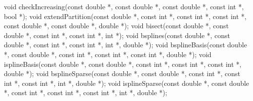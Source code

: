 \documentclass[
  12pt,
  letterpaper,
  DIV=11,
  numbers=noendperiod]{scrreprt}
\newenvironment{Shaded}{\begin{snugshade}}{\end{snugshade}}
\newcommand{\DataTypeTok}[1]{\textcolor[rgb]{0.68,0.00,0.00}{#1}}
\newcommand{\NormalTok}[1]{\textcolor[rgb]{0.00,0.23,0.31}{#1}}
\newcommand{\OperatorTok}[1]{\textcolor[rgb]{0.37,0.37,0.37}{#1}}
\theoremstyle{remark}
\begin{document}
\begin{Shaded}
\begin{Highlighting}[]
\DataTypeTok{void}\NormalTok{ checkIncreasing}\OperatorTok{(}\DataTypeTok{const} \DataTypeTok{double} \OperatorTok{*,} \DataTypeTok{const} \DataTypeTok{double} \OperatorTok{*,} \DataTypeTok{const} \DataTypeTok{double} \OperatorTok{*,}
                     \DataTypeTok{const} \DataTypeTok{int} \OperatorTok{*,} \DataTypeTok{bool} \OperatorTok{*);}
\DataTypeTok{void}\NormalTok{ extendPartition}\OperatorTok{(}\DataTypeTok{const} \DataTypeTok{double} \OperatorTok{*,} \DataTypeTok{const} \DataTypeTok{int} \OperatorTok{*,} \DataTypeTok{const} \DataTypeTok{int} \OperatorTok{*,} \DataTypeTok{const} \DataTypeTok{int} \OperatorTok{*,}
                     \DataTypeTok{const} \DataTypeTok{double} \OperatorTok{*,} \DataTypeTok{const} \DataTypeTok{double} \OperatorTok{*,} \DataTypeTok{double} \OperatorTok{*);}
\DataTypeTok{void}\NormalTok{ bisect}\OperatorTok{(}\DataTypeTok{const} \DataTypeTok{double} \OperatorTok{*,} \DataTypeTok{const} \DataTypeTok{double} \OperatorTok{*,} \DataTypeTok{const} \DataTypeTok{int} \OperatorTok{*,} \DataTypeTok{const} \DataTypeTok{int} \OperatorTok{*,} \DataTypeTok{int} \OperatorTok{*);}
\DataTypeTok{void}\NormalTok{ bsplines}\OperatorTok{(}\DataTypeTok{const} \DataTypeTok{double} \OperatorTok{*,} \DataTypeTok{const} \DataTypeTok{double} \OperatorTok{*,} \DataTypeTok{const} \DataTypeTok{int} \OperatorTok{*,} \DataTypeTok{const} \DataTypeTok{int} \OperatorTok{*,} \DataTypeTok{int} \OperatorTok{*,}
              \DataTypeTok{double} \OperatorTok{*);}
\DataTypeTok{void}\NormalTok{ bsplineBasis}\OperatorTok{(}\DataTypeTok{const} \DataTypeTok{double} \OperatorTok{*,} \DataTypeTok{const} \DataTypeTok{double} \OperatorTok{*,} \DataTypeTok{const} \DataTypeTok{int} \OperatorTok{*,} \DataTypeTok{const} \DataTypeTok{int} \OperatorTok{*,}
                  \DataTypeTok{const} \DataTypeTok{int} \OperatorTok{*,} \DataTypeTok{double} \OperatorTok{*);}
\DataTypeTok{void}\NormalTok{ isplineBasis}\OperatorTok{(}\DataTypeTok{const} \DataTypeTok{double} \OperatorTok{*,} \DataTypeTok{const} \DataTypeTok{double} \OperatorTok{*,} \DataTypeTok{const} \DataTypeTok{int} \OperatorTok{*,} \DataTypeTok{const} \DataTypeTok{int} \OperatorTok{*,}
                  \DataTypeTok{const} \DataTypeTok{int} \OperatorTok{*,} \DataTypeTok{double} \OperatorTok{*);}
\DataTypeTok{void}\NormalTok{ bsplineSparse}\OperatorTok{(}\DataTypeTok{const} \DataTypeTok{double} \OperatorTok{*,} \DataTypeTok{const} \DataTypeTok{double} \OperatorTok{*,} \DataTypeTok{const} \DataTypeTok{int} \OperatorTok{*,} \DataTypeTok{const} \DataTypeTok{int} \OperatorTok{*,}
                   \DataTypeTok{const} \DataTypeTok{int} \OperatorTok{*,} \DataTypeTok{int} \OperatorTok{*,} \DataTypeTok{double} \OperatorTok{*);}
\DataTypeTok{void}\NormalTok{ isplineSparse}\OperatorTok{(}\DataTypeTok{const} \DataTypeTok{double} \OperatorTok{*,} \DataTypeTok{const} \DataTypeTok{double} \OperatorTok{*,} \DataTypeTok{const} \DataTypeTok{int} \OperatorTok{*,} \DataTypeTok{const} \DataTypeTok{int} \OperatorTok{*,}
                   \DataTypeTok{const} \DataTypeTok{int} \OperatorTok{*,} \DataTypeTok{int} \OperatorTok{*,} \DataTypeTok{double} \OperatorTok{*);}


\end{Highlighting}
\end{Shaded}
\end{document}
